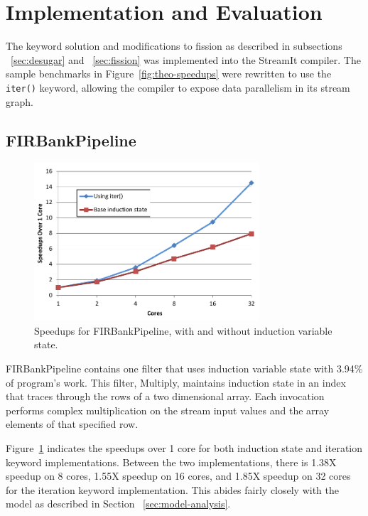 \section{Implementation and Evaluation}
\label{sec:analysis}

The keyword solution and modifications to fission as described in subsections ~\ref{sec:desugar} and ~\ref{sec:fission} was implemented into the StreamIt compiler.  The sample benchmarks in Figure~\ref{fig:theo-speedups} were rewritten to use the {\tt iter()} keyword, allowing the compiler to expose data parallelism in its stream graph.






\subsection{FIRBankPipeline}
\begin{figure}[t]
\includegraphics[width=3.3in]{figures/firbank-results.pdf}
\caption{Speedups for FIRBankPipeline, with and without induction variable state.  \protect\label{fig:firbank-results}}
\end{figure}

FIRBankPipeline contains one filter that uses induction variable state with 3.94\% of program's work.  This filter, Multiply, maintains induction state in an index that traces through the rows of a two dimensional array.  Each invocation performs complex multiplication on the stream input values and the array elements of that specified row.  

Figure~\ref{fig:firbank-results} indicates the speedups over 1 core for both induction state and iteration keyword implementations.  Between the two implementations, there is 1.38X speedup on 8 cores, 1.55X speedup on 16 cores, and 1.85X speedup on 32 cores for the iteration keyword implementation.  This abides fairly closely with the model as described in Section ~\ref{sec:model-analysis}.  